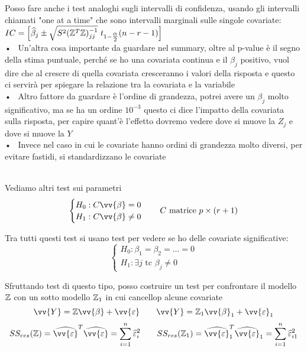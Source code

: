Posso fare anche i test analoghi sugli intervalli di confidenza, usando gli intervalli chiamati "one at a time" che sono intervalli marginali sulle singole covariate: \ $IC = \OO\hat{\beta}_j \pm \sqrt{S^2(\ZZ^T\ZZ)^{-1}_{jj}} \ t_{1-\tfrac{\alpha}{2}}(n-r-1)\CC$\\

• \ Un'altra cosa importante da guardare nel summary, oltre al p-value è  il segno della stima puntuale, perché se ho una covariata continua e il $\beta_j$ positivo, vuol dire che al crescre di quella covariata cresceranno i valori della risposta e questo ci servirà per spiegare la relazione tra la covariata e la variabile\\

• \ Altro fattore da guardare è l'ordine di grandezza, potrei avere un $\beta_j$ molto significativo, ma se ha un ordine $10^{-3}$ questo ci dice l'impatto della covariata sulla risposta, per capire quant'è l'effetto dovremo vedere dove si muove la $Z_j$ e dove si muove la $Y$\\

• \ Invece nel caso in cui le covariate hanno ordini di grandezza molto diversi, per evitare fastidi, si standardizzano le covariate
\newpage



\\

Vediamo altri test sui parametri
\[
\begin{cases}
    H_0: C\vv{\beta} =0\\
    H_1: C\vv{\beta}\ne 0
\end{cases} \ \ \ C \text{ matrice } p\times (r+1)
\]
\phantom{}

Tra tutti questi test si usano test per vedere se ho delle covariate significative:
\[
\begin{cases}
    H_0: \beta_1 = \beta_2 = ... =0\\
    H_1: \exists j \text{ tc } \beta_j \ne 0
\end{cases}
\]
\phantom{}

Sfruttando test di questo tipo, posso costruire un test per confrontare il modello $\mathbb Z$ con un sotto modello $\mathbb Z_1$ in cui cancellop alcune covariate\\
\[
\vv{Y}=\ZZ \vv{\beta} + \vv{\eps} \hspace{20pt} \vv{Y}=\ZZ_1 \vv{\beta}_1 + \vv{\eps}_1
\]
\[
SS_{res}(\ZZ) = \hat{\vv{\eps}}^T\hat{\vv{\eps}} = \Sum{i=1}{n} \hat{\eps}_i^2 \hspace{20pt} SS_{res}(\ZZ_1) = \hat{\vv{\eps}}_1^T\hat{\vv{\eps}}_1 = \Sum{i=1}{n} \hat{\eps}_{i1}^2 
\]
\phantom{}

